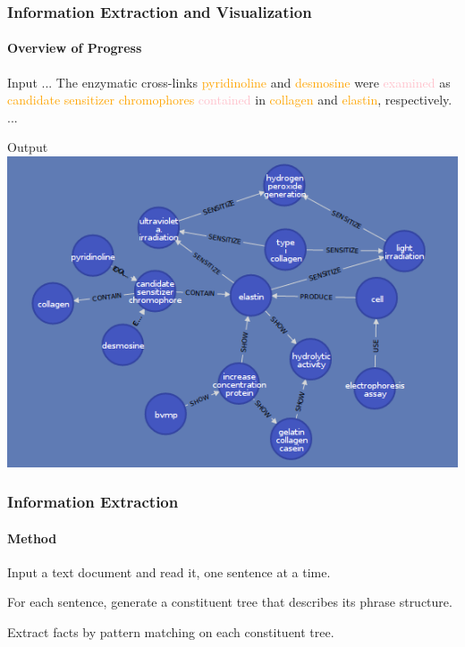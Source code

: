 \documentclass[mathserif]{beamer}
\begin{document}
\begin{frame}

\frametitle{Information Extraction and Visualization}
\framesubtitle{Overview of Progress}

\centering

\begin{block}{Input}
... The enzymatic cross-links \textcolor{orange}{pyridinoline} and \textcolor{orange}{desmosine} were \textcolor{pink}{examined}
as \textcolor{orange}{candidate sensitizer chromophores} \textcolor{pink}{contained} in \textcolor{orange}{collagen} and \textcolor{orange}{elastin},
respectively. ...
\end{block}

\begin{block}{Output}
\centering
\includegraphics[width=0.5\linewidth]{images/elastinneighborhood.png}
\end{block}

\end{frame}


\begin{frame}

\frametitle{Information Extraction}
\framesubtitle{Method}

\begin{description}[<+->]

\item[Tokenization] Input a text document and read it, one sentence at a time.
\item[Parsing] For each sentence, generate a constituent tree that describes its phrase structure.
\item[Compilation] Extract facts by pattern matching on each constituent tree.

\end{description}

\end{frame}
\end{document}
